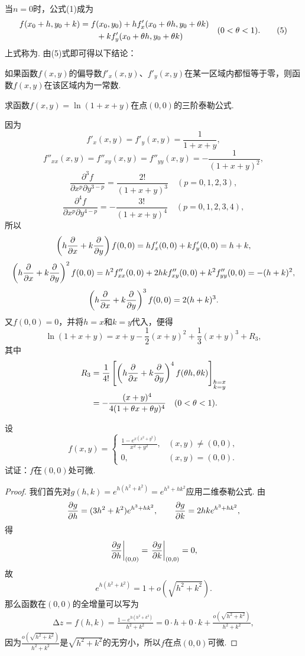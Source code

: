 当\(n=0\)时，公式(1)成为\begin{gather}
\label{equation:多元函数微分法.二元函数的拉格朗日中值公式}
\begin{split}
f(x_0+h,y_0+k)
&=f(x_0,y_0)
+h f'_x(x_0+\theta h,y_0+\theta k) \\
&\hspace{20pt}+k f'_y(x_0+\theta h,y_0+\theta k)
\end{split}
\quad(0<\theta<1).
\tag5
\end{gather}上式称为.
由(5)式即可得以下结论：

如果函数\(f(x,y)\)的偏导数\(f'_x(x,y)\)、\(f'_y(x,y)\)在某一区域内都恒等于零，则函数\(f(x,y)\)在该区域内为一常数.

\begin{example}
求函数\(f(x,y) = \ln(1+x+y)\)在点\((0,0)\)的三阶泰勒公式.
\begin{solution}
\def\oprt#1{\left(h\pdv{x}+k\pdv{y}\right)\ifx\relax#1\relax\else^{#1}\fi}
因为\[
f'_x(x,y) = f'_y(x,y) = \frac{1}{1+x+y},
\]\[
f''_{xx}(x,y) = f''_{xy}(x,y) = f''_{yy}(x,y) = -\frac{1}{(1+x+y)^2},
\]\[
\frac{\partial^3 f}{\partial x^p \partial y^{3-p}}
= \frac{2!}{(1+x+y)^3}
\quad(p=0,1,2,3),
\]\[
\frac{\partial^4 f}{\partial x^p \partial y^{4-p}}
= -\frac{3!}{(1+x+y)^4}
\quad(p=0,1,2,3,4),
\]所以\[
\oprt{} f(0,0) = h f'_x(0,0) + k f'_y(0,0) = h+k,
\]\[
\oprt{2} f(0,0) = h^2 f''_{xx}(0,0) + 2hk f''_{xy}(0,0) + k^2 f''_{yy}(0,0) = -(h+k)^2,
\]\[
\oprt{3} f(0,0) = 2(h+k)^3.
\]又\(f(0,0)=0\)，并将\(h=x\)和\(k=y\)代入，便得\[
\ln(1+x+y) = x+y-\frac{1}{2}(x+y)^2+\frac{1}{3}(x+y)^3+R_3,
\]其中\begin{align*}
R_3
&= \frac{1}{4!} \left[\oprt{4} f(\theta h,\theta k)\right]_{\substack{h=x\\k=y}} \\
&= -\frac{(x+y)^4}{4(1+\theta x+\theta y)^4}
\quad(0<\theta<1).
\end{align*}
\end{solution}
\end{example}

\begin{example}
\def\ev#1{\eval{#1}_{(0,0)}}%
设\[
f(x,y) = \begin{cases}
\frac{1 - e^{x(x^2+y^2)}}{x^2+y^2}, & (x,y)\neq(0,0), \\
0, & (x,y)=(0,0).
\end{cases}
\]试证：\(f\)在\((0,0)\)处可微.
\begin{proof}
我们首先对\(g(h,k) = e^{h(h^2+k^2)} = e^{h^3+hk^2}\)应用二维泰勒公式.
由\[
\pdv{g}{h} = (3h^2+k^2)e^{h^3+hk^2}, \qquad
\pdv{g}{k} = 2hke^{h^3+hk^2},
\]得\[
\ev{\pdv{g}{h}} = \ev{\pdv{g}{k}} = 0,
\]故\[
e^{h(h^2+k^2)} = 1 + o(\sqrt{h^2+k^2}).
\]
那么函数在\((0,0)\)的全增量可以写为
\begin{align*}
\increment z = f(h,k) = \frac{1 - e^{h(h^2+k^2)}}{h^2+k^2}
= 0 \cdot h + 0 \cdot k + \frac{o(\sqrt{h^2+k^2})}{h^2+k^2},
\end{align*}
因为\(\frac{o(\sqrt{h^2+k^2})}{h^2+k^2}\)是\(\sqrt{h^2+k^2}\)的无穷小，所以\(f\)在点\((0,0)\)可微.
\end{proof}
\end{example}

